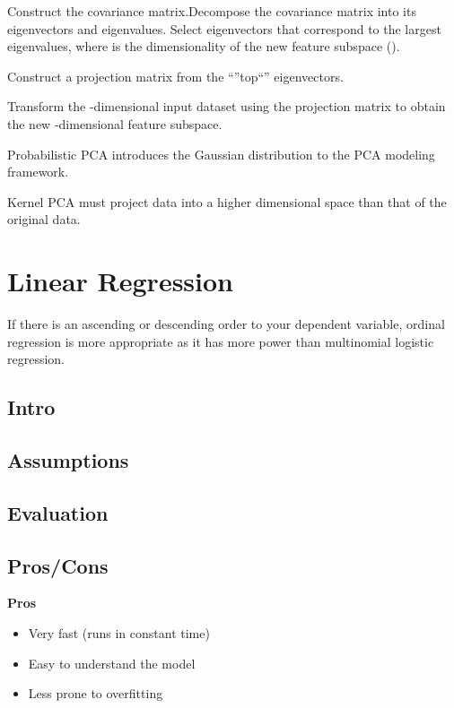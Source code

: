 \documentclass[]{book}
\theoremstyle{definition}
\theoremstyle{definition}
\theoremstyle{definition}
\theoremstyle{remark}
\begin{document}
Construct the covariance matrix.Decompose the covariance matrix into its
eigenvectors and eigenvalues. Select eigenvectors that correspond to the
largest eigenvalues, where is the dimensionality of the new feature
subspace ().

Construct a projection matrix from the ``''top``'' eigenvectors.

Transform the -dimensional input dataset using the projection matrix to
obtain the new -dimensional feature subspace.

Probabilistic PCA introduces the Gaussian distribution to the PCA
modeling framework.

Kernel PCA must project data into a higher dimensional space than that
of the original data.

\section{Linear Regression}\label{linear-regression}

If there is an ascending or descending order to your dependent variable,
ordinal regression is more appropriate as it has more power than
multinomial logistic regression.

\subsection{Intro}\label{intro-6}

\subsection{Assumptions}\label{assumptions-6}

\subsection{Evaluation}\label{evaluation-6}

\subsection{Pros/Cons}\label{proscons-6}

\textbf{Pros}

\begin{itemize}
\item
  Very fast (runs in constant time)
\item
  Easy to understand the model
\item
  Less prone to overfitting
\end{itemize}
\end{document}
